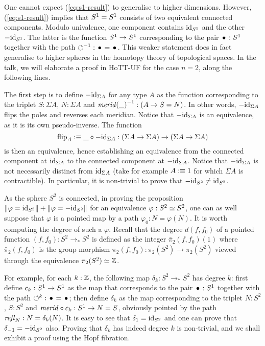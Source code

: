 \documentclass{easychair}
\newcommand{\Sp}{{S^2}}%
\newcommand{\mrd}{\mathit{merid}}%
\newcommand{\susp}[1]{\Sigma{#1}}%
\newcommand{\ptdto}{\to_\ast}%
\newcommand{\flip}{\operatorname{flip}}%
\def\blank{\_}%
\begin{document}
One cannot expect (\ref{eq:s1-result}) to generalise to higher
dimensions. However, (\ref{eq:s1-result}) implies that ${S^1} = {S^1}$
consists of two equivalent connected components. Modulo univalence,
one component contains $\mathord{\mathrm{id}}_{S^1}$ and the other $-\mathord{\mathrm{id}}_{S^1}$. The latter
is the function ${S^1} \to {S^1}$ corresponding to the pair $\base:\Sc$
together with the path $\inv\Sloop:\base=\base$. This weaker statement
does in fact generalise to higher spheres in the homotopy theory of
topological spaces. In the talk, we will elaborate a proof in HoTT-UF
for the case $n=2$, along the following lines.

The first step is to define $-\id_{\susp A}$ for any type $A$ as the
function corresponding to the triplet $S:\susp A$, $N:\susp A$ and
$\inv{\mrd(\blank)} : (A \to S=N)$. In other words, $-\id_{\susp A}$
flips the poles and reverses each meridian. Notice that
$-\id_{\susp A}$ is an equivalence, as it is its own
pseudo-inverse. The function
\begin{displaymath}
  \flip_A \defequi \blank \circ -\id_{\susp A} : (\susp A \to \susp A) \to (\susp A \to \susp A)
\end{displaymath}
is then an equivalence, hence establishing an equivalence from the
connected component at $\id_{\susp A}$ to the connected component at
$-\id_{\susp A}$. Notice that $-\id_{\susp A}$ is not necessarily
distinct from $\id_{\susp A}$ (take for example $A\mathrel{\hbox{:}\mkern-5mu\equiv} 1$ for
which $\susp A$ is contractible). In particular, it is non-trivial to
prove that $-\id_{\Sp} \neq \id_{\Sp}$.

As the sphere $\Sp$ is connected, in proving the proposition
$\Trunc{\varphi=\id_\Sp}+\Trunc{\varphi=-\id_\Sp}$ for an equivalence
$\varphi:\Sp \weq \Sp$, one can as well suppose that $\varphi$ is a
pointed map by a path $\varphi_0:N=\varphi(N)$. It is worth computing
the degree of such a $\varphi$. Recall that the degree $d(f,f_0)$ of a
pointed function $(f,f_0):\Sp \ptdto\Sp$ is defined as the integer
$\bar \pi_2(f,f_0)(1)$ where $\bar\pi_2(f,f_0)$ is the group morphism
$\pi_2(f,f_0) : \pi_2(\Sp) \to \pi_2(\Sp)$ viewed through the
equivalence $\pi_2(\Sp) \weq \ZZ$.

For example, for each $k:\mathbb{Z}$, the following map
$\delta_k : \Sp \ptdto \Sp$ has degree $k$: first define
$c_k:{S^1}\to{S^1}$ as the map that corresponds to the pair $\base:\Sc$
together with the path $\Sloop^k:\base=\base$; then define $\delta_k$
as the map corresponding to the triplet $N:\Sp$, $S:\Sp$ and
$\mrd{}\circ c_k: \Sc \to N=S$, obviously pointed by the path
$\mathop{{\mathit{refl}}_{N}}:N=\delta_k(N)$.  It is easy to see that
$\delta_1 = \id_{\Sp}$ and one can prove that
$\delta_{-1} = -\id_{\Sp}$ also.  Proving that $\delta_k$ has indeed
degree $k$ is non-trivial, and we shall exhibit a proof using the Hopf
fibration.
\end{document}
